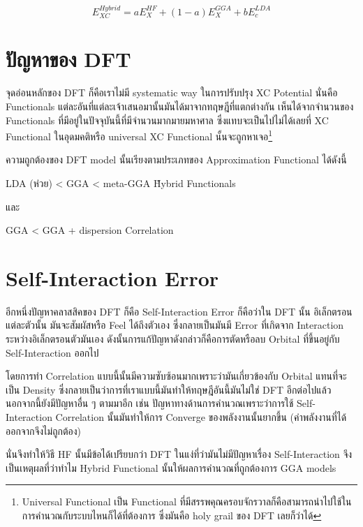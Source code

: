 \begin{equation}
    E^{Hybrid}_{XC} = a E^{HF}_{X} + (1 - a) E^{GGA}_{X} + b E^{LDA}_{c}
\end{equation}

\section{ปัญหาของ DFT}

จุดอ่อนหลักของ DFT ก็คือเราไม่มี systematic way ในการปรับปรุง XC Potential นั่นคือ Functionals 
แต่ละอันที่แต่ละเจ้าเสนอมานั้นมันได้มาจากทฤษฎีที่แตกต่างกัน เห็นได้จากจำนวนของ Functionals 
ที่มีอยู่ในปัจจุบันนี้ที่มีจำนวนมากมายมหาศาล ซึ่งแทบจะเป็นไปไม่ได้เลยที่ XC Functional ในอุดมคติหรือ 
universal XC Functional นั้นจะถูกหาเจอ\footnote{Universal Functional เป็น Functional 
ที่มีสรรพคุณครอบจักรวาลก็คือสามารถนำไปใช้ในการคำนวณกับระบบไหนก็ได้ที่ต้องการ ซึ่งมันคือ holy grail 
ของ DFT เลยก็ว่าได้}

ความถูกต้องของ DFT model นั้นเรียงตามประเภทของ Approximation Functional ได้ดังนี้ 

LDA (ห่วย) < GGA < meta-GGA \~ Hybrid Functionals 

\noindent และ 

GGA < GGA + dispersion Correlation 

\section{Self-Interaction Error}

อีกหนึ่งปัญหาคลาสสิคของ DFT ก็คือ Self-Interaction Error ก็คือว่าใน DFT นั้น อิเล็กตรอนแต่ละตัวนั้น%
มันจะสัมผัสหรือ Feel ได้ถึงตัวเอง ซึ่งกลายเป็นมันมี Error ที่เกิดจาก Interaction ระหว่างอิเล็กตรอนตัวมันเอง 
ดังนั้นการแก้ปัญหาดังกล่าวก็คือการตัดหรือลบ Orbital ที่ขึ้นอยู่กับ Self-Interaction ออกไป 

โดยการทำ Correlation แบบนี้นั้นมีความซับซ้อนมากเพราะว่ามันเกี่ยวข้องกับ Orbital แทนที่จะเป็น Density 
ซึ่งกลายเป็นว่าการที่เราแบบนี้มันทำให้ทฤษฎีอันนี้มันไม่ใช่ DFT อีกต่อไปแล้ว นอกจากนี้ยังมีปัญหาอื่น ๆ ตามมาอีก เช่น 
ปัญหาทางด้านการคำนวณเพราะว่าการใช้ Self-Interaction Correlation นั้นมันทำให้การ Converge 
ของพลังงานนั้นยากขึ้น (ค่าพลังงานที่ได้ออกจากจึงไม่ถูกต้อง)

นั่นจึงทำให้วิธี HF นั้นมีข้อได้เปรียบกว่า DFT ในแง่ที่ว่ามันไม่มีปัญหาเรื่อง Self-Interaction จึงเป็นเหตุผลที่ว่าทำไม 
Hybrid Functional นั้นให้ผลการคำนวณที่ถูกต้องการ GGA models 
